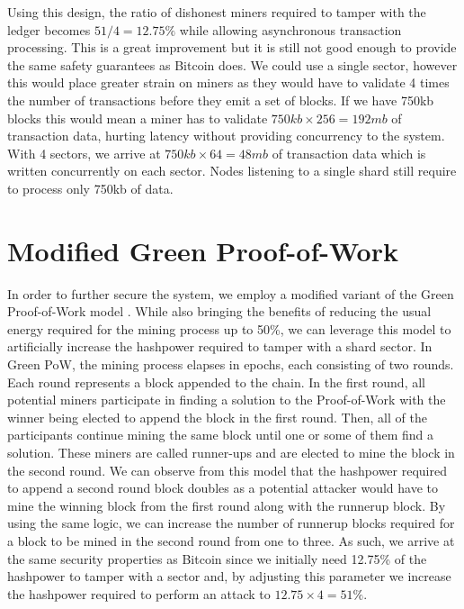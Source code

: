 \documentclass[notitlepage]{article}
\begin{document}
Using this design, the ratio of dishonest miners required to tamper with the ledger becomes $51/4 = 12.75\%$ while allowing asynchronous transaction processing. This is a great improvement but it is still not good enough to provide the same safety guarantees as Bitcoin does. We could use a single sector, however this would place greater strain on miners as they would have to validate 4 times the number of transactions before they emit a set of blocks. If we have 750kb blocks this would mean a miner has to validate $750kb \times 256 = 192mb$ of transaction data, hurting latency without providing concurrency to the system. With 4 sectors, we arrive at $750kb \times 64 = 48mb$ of transaction data which is written concurrently on each sector. Nodes listening to a single shard still require to process only 750kb of data. 

\section{Modified Green Proof-of-Work}
In order to further secure the system, we employ a modified variant of the Green Proof-of-Work model \cite{greenpow}. While also bringing the benefits of reducing the usual energy required for the mining process up to 50\%, we can leverage this model to artificially increase the hashpower required to tamper with a shard sector. In Green PoW, the mining process elapses in epochs, each consisting of two rounds. Each round represents a block appended to the chain. In the first round, all potential miners participate in finding a solution to the Proof-of-Work with the winner being elected to append the block in the first round. Then, all of the participants continue mining the same block until one or some of them find a solution. These miners are called runner-ups and are elected to mine the block in the second round. We can observe from this model that the hashpower required to append a second round block doubles as a potential attacker would have to mine the winning block from the first round along with the runnerup block. By using the same logic, we can increase the number of runnerup blocks required for a block to be mined in the second round from one to three. As such, we arrive at the same security properties as Bitcoin since we initially need 12.75\% of the hashpower to tamper with a sector and, by adjusting this parameter we increase the hashpower required to perform an attack to $12.75 \times 4 = 51\%$.
\end{document}
